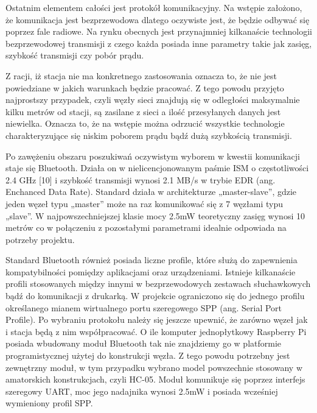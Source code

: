 \documentclass[12pt, twoside, openany]{mwrep}
\begin{document}
Ostatnim elementem całości jest protokół komunikacyjny. Na wstępie założono, że komunikacja jest bezprzewodowa dlatego oczywiste jest, że będzie odbywać się poprzez fale radiowe. Na rynku obecnych jest przynajmniej kilkanaście technologii bezprzewodowej transmisji z czego każda posiada inne parametry takie jak zasięg, szybkość transmisji czy pobór prądu. 
\par
Z racji, iż stacja nie ma konkretnego zastosowania oznacza to, że nie jest powiedziane w jakich warunkach będzie pracować. Z tego powodu przyjęto najprostszy przypadek, czyli węzły sieci znajdują się w odległości maksymalnie kilku metrów od stacji, są zasilane z sieci a ilość przesyłanych danych jest niewielka. Oznacza to, że na wstępie można odrzucić wszystkie technologie charakteryzujące się niskim poborem prądu bądź dużą szybkością transmisji.
\par
Po zawężeniu obszaru poszukiwań oczywistym wyborem w kwestii komunikacji staje się Bluetooth. Działa on w nielicencjonowanym paśmie ISM o częstotliwości 2.4 GHz [10] i szybkość transmisji wynosi 2.1 MB/s w trybie EDR (ang. Enchanced Data Rate).  Standard działa w architekturze „master-slave”, gdzie jeden węzeł typu „master” może na raz komunikować się z 7 węzłami typu „slave”. W najpowszechniejszej klasie mocy 2.5mW teoretyczny zasięg wynosi 10 metrów co w połączeniu z pozostałymi parametrami idealnie odpowiada na potrzeby projektu.
\par
Standard Bluetooth również posiada liczne profile, które służą do zapewnienia kompatybilności pomiędzy aplikacjami oraz urządzeniami. Istnieje kilkanaście profili stosowanych między innymi w bezprzewodowych zestawach słuchawkowych bądź do komunikacji z drukarką. W projekcie ograniczono się do jednego profilu określanego mianem wirtualnego portu szeregowego SPP (ang. Serial Port Profile). 
Po wybraniu protokołu należy się jeszcze upewnić, że zarówno węzeł jak i stacja będą z nim współpracować. O ile komputer jednopłytkowy Raspberry Pi posiada wbudowany moduł Bluetooth tak nie znajdziemy go w platformie programistycznej użytej do konstrukcji węzła. Z tego powodu potrzebny jest zewnętrzny moduł, w tym przypadku wybrano model powszechnie stosowany w amatorskich konstrukcjach, czyli HC-05. Moduł komunikuje się poprzez interfejs szeregowy UART, moc jego nadajnika wynosi 2.5mW i posiada wcześniej wymieniony profil SPP.
\end{document}

